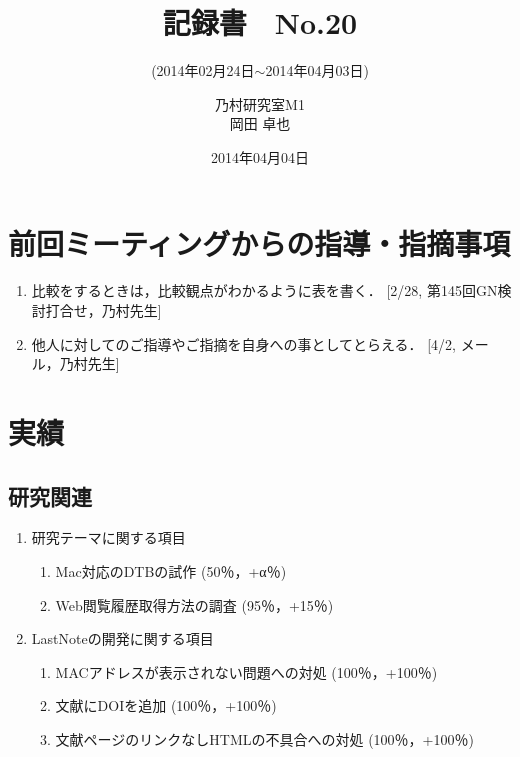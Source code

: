 \documentclass[fleqn, 14pt]{extarticle}
\subtitle{(2014年02月24日$\sim$2014年04月03日)}
\author{乃村研究室M1\\岡田 卓也}
\date{2014年04月04日}
\title{記録書　No.20}
\begin{document}
\maketitle
\section{前回ミーティングからの指導・指摘事項}
\label{sec-1}
\begin{enumerate}
\item 比較をするときは，比較観点がわかるように表を書く．
\newline
\hfill
[2/28, 第145回GN検討打合せ，乃村先生]
\item 他人に対してのご指導やご指摘を自身への事としてとらえる．
\newline
\hfill
[4/2, メール，乃村先生]
\end{enumerate}
\section{実績}
\label{sec-2}
\subsection{研究関連}
\label{sec-2-1}
\begin{enumerate}
\item 研究テーマに関する項目
\hfill
\label{enum-research1}
\begin{enumerate}
\item Mac対応のDTBの試作
\hfill
\label{enum-1-A}
(50％，+α％)
\item Web閲覧履歴取得方法の調査
\hfill
\label{enum-1-B}
(95％，+15％)
\end{enumerate}
\item LastNoteの開発に関する項目
\hfill
\label{enum-research2}
\begin{enumerate}
\item MACアドレスが表示されない問題への対処
\hfill
\label{enum-2-A}
(100％，+100％)
\item 文献にDOIを追加
\hfill
\label{enum-2-B}
(100％，+100％)
\item 文献ページのリンクなしHTMLの不具合への対処
\hfill
\label{enum-2-C}
(100％，+100％)
\end{enumerate}
\end{enumerate}
\end{document}
